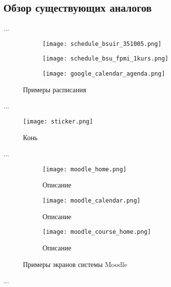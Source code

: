 \subsection{Обзор существующих аналогов}
\label{sec:analysis:analogues}

...

\begin{sidewaysfigure}
\centering
	\begin{subfigure}[b]{0.3\textwidth}
	    \centering
		\texttt{[image: schedule\_bsuir\_351005.png]} 
		\caption{}
		\label{fig:analysis:analogues:bsuir}
	\end{subfigure}
	\begin{subfigure}[b]{0.3\textwidth}
	    \centering
		\texttt{[image: schedule\_bsu\_fpmi\_1kurs.png]}
		\caption{}
		\label{fig:analysis:analogues:bsu_fpmi}
	\end{subfigure}
	\begin{subfigure}[b]{0.3\textwidth}
	    \centering
		\texttt{[image: google\_calendar\_agenda.png]} 
		\caption{}
		\label{fig:analysis:analogues:google_calendar}
	\end{subfigure}
	\caption{Примеры расписания}
\end{sidewaysfigure}

...

\begin{figure}
\centering
	\texttt{[image: sticker.png]}
	\caption{Конь}
	\label{sec:domain:horse}
\end{figure}

...

\begin{figure}
\centering
	\begin{subfigure}[ht]{0.8\textwidth}
	    \centering
		\texttt{[image: moodle\_home.png]}
		\caption{Описание}
		\label{fig:analysis:analogues:moodle_home}
	\end{subfigure}
	\begin{subfigure}[ht]{0.8\textwidth}
	    \centering
		\texttt{[image: moodle\_calendar.png]}
		\caption{Описание}
		\label{fig:analysis:analogues:moodle_calendar}
	\end{subfigure}
	\begin{subfigure}[ht]{0.8\textwidth}
	    \centering
		\texttt{[image: moodle\_course\_home.png]} 
		\caption{Описание}
		\label{fig:analysis:analogues:moodle_course_home}
	\end{subfigure}
	\caption{Примеры экранов системы Moodle}
\end{figure}

...
